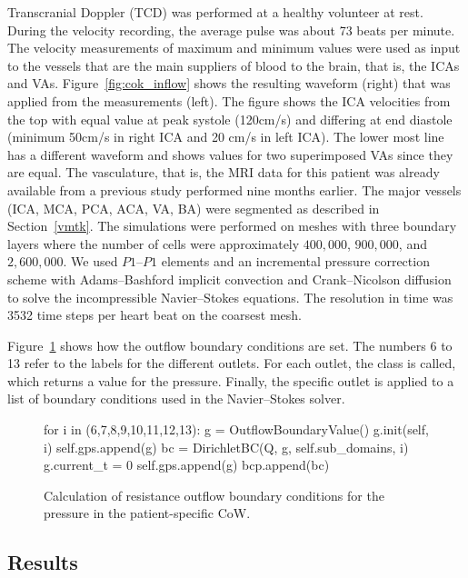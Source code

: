 Transcranial Doppler (TCD) was performed at a healthy volunteer at
rest. During the velocity recording, the average pulse was about 73
beats per minute. The velocity measurements of maximum and minimum
values were used as input to the vessels that are the main suppliers
of blood to the brain, that is, the ICAs and
VAs. Figure~\ref{fig:cok_inflow} shows the resulting waveform (right)
that was applied from the measurements (left). The figure shows the
ICA velocities from the top with equal value at peak systole (120cm/s)
and differing at end diastole (minimum 50cm/s in right ICA and 20 cm/s
in left ICA). The lower most line has a different waveform and shows
values for two superimposed VAs since they are equal. The vasculature,
that is, the MRI data for this patient was already available from a
previous study performed nine months earlier. The major vessels (ICA,
MCA, PCA, ACA, VA, BA) were segmented as described in
Section~\ref{vmtk}. The simulations were performed on meshes with
three boundary layers where the number of cells were approximately
$400,000$, $900,000$, and $2,600,000$. We used $P1$--$P1$ elements and
an incremental pressure correction scheme with Adams--Bashford
implicit convection and Crank--Nicolson diffusion to solve the
incompressible Navier--Stokes equations. The resolution in time was
3532 time steps per heart beat on the coarsest mesh.

Figure~\ref{fig:outflow_code} shows how the outflow boundary
conditions are set. The numbers 6 to 13 refer to the labels for the
different outlets. For each outlet, the class
 is called, which returns a value for the
pressure. Finally, the specific outlet is applied to a list of
boundary conditions used in the Navier--Stokes solver.

\begin{figure}
  \begin{center}
    \begin{python}
for i in (6,7,8,9,10,11,12,13):
	g = OutflowBoundaryValue()
	g.init(self, i)
	self.gps.append(g)
	bc = DirichletBC(Q, g, self.sub_domains, i)
	g.current_t = 0
	self.gps.append(g)
	bcp.append(bc)
    \end{python}
    \caption{Calculation of resistance outflow boundary conditions for
      the pressure in the patient-specific CoW.}
    \label{fig:outflow_code}
  \end{center}
\end{figure}

\subsection{Results}


